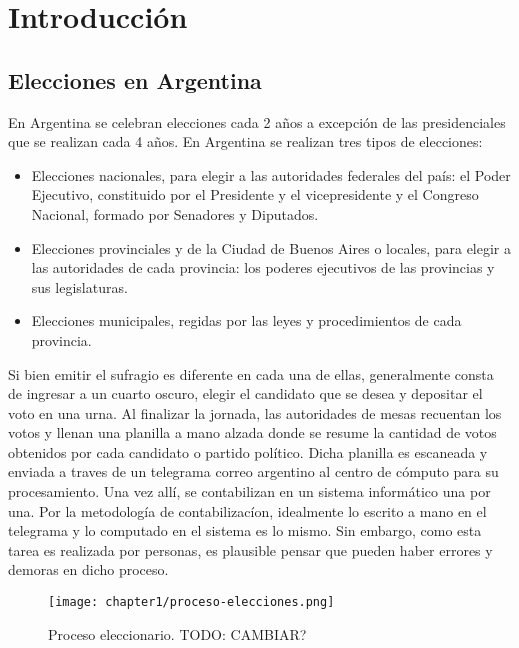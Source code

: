 \chapter{Introducci\'on}

\label{Chapter1}

\section{Elecciones en Argentina}

En Argentina se celebran elecciones cada 2 a\~{n}os a excepci\'on de las presidenciales que se realizan cada 4
a\~{n}os. En Argentina se realizan tres tipos de elecciones:

\begin{itemize}
    \item Elecciones nacionales, para elegir a las autoridades federales del país: el Poder Ejecutivo, constituido por el
          Presidente y el vicepresidente y el Congreso Nacional, formado por Senadores y Diputados.
    \item Elecciones provinciales y de la Ciudad de Buenos Aires o locales, para elegir a las autoridades de cada provincia: los
          poderes ejecutivos de las provincias y sus legislaturas.
    \item Elecciones municipales, regidas por las leyes y procedimientos de cada provincia.
\end{itemize}

Si bien emitir el sufragio es diferente en cada una de ellas, generalmente consta de ingresar a un cuarto oscuro,
elegir el candidato que se desea y depositar el voto en una urna. Al finalizar la jornada, las autoridades de mesas
recuentan los votos y llenan una planilla a mano alzada donde se resume la cantidad de votos obtenidos por cada
candidato o partido pol\'itico. Dicha planilla es escaneada y enviada a traves de un telegrama correo argentino al
centro de c\'omputo para su procesamiento. Una vez all\'i, se contabilizan en un sistema inform\'atico una por una. Por
la metodolog\'ia de contabilizac\'ion, idealmente lo escrito a mano en el telegrama y lo computado en el sistema es lo
mismo. Sin embargo, como esta tarea es realizada por personas, es plausible pensar que pueden haber errores y demoras
en dicho proceso.

\begin{figure}[H]
    \centering
    \texttt{[image: chapter1/proceso-elecciones.png]}
    \caption{Proceso eleccionario. TODO: CAMBIAR?}
    \label{fig:proceso-elecciones}
\end{figure}

